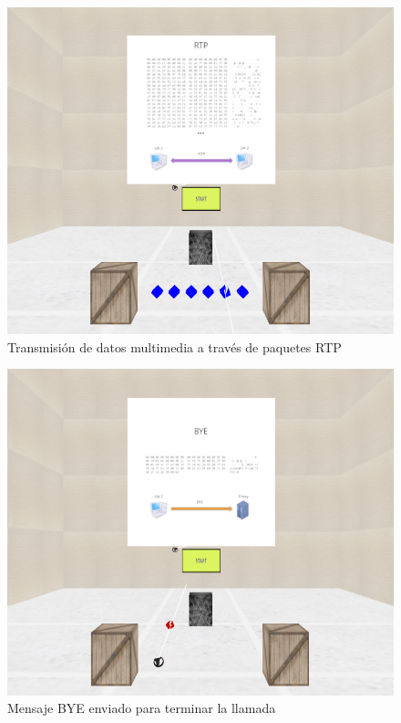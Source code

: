 \documentclass[a4paper, 12pt]{book}
\begin{document}
\begin{figure}
  \centering
  \includegraphics[width=12cm, keepaspectratio]{img/resultados/15-RTP.png}
  \caption{Transmisión de datos multimedia a través de paquetes RTP}
  \label{fig:15-RTP}
\end{figure}

\begin{figure}
  \centering
  \includegraphics[width=12cm, keepaspectratio]{img/resultados/16-BYE.png}
  \caption{Mensaje BYE enviado para terminar la llamada}
  \label{fig:16-BYE}
\end{figure}
\end{document}
